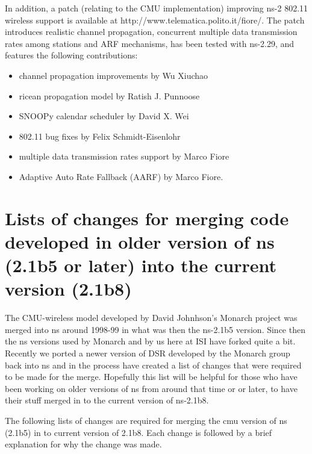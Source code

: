 In addition, a  patch (relating to the CMU implementation) improving ns-2 
802.11 wireless support is available at http://www.telematica.polito.it/fiore/.
The patch introduces realistic channel propagation, concurrent multiple 
data transmission rates among stations and ARF mechanisms, has been 
tested with ns-2.29, and features the following contributions:
\begin{itemize}
\item channel propagation improvements by Wu Xiuchao
\item ricean propagation model by Ratish J. Punnoose
\item SNOOPy calendar scheduler by David X. Wei
\item 802.11 bug fixes by Felix Schmidt-Eisenlohr
\item multiple data transmission rates support by Marco Fiore
\item Adaptive Auto Rate Fallback (AARF) by Marco Fiore. 
\end{itemize}

\section{Lists of changes for merging code developed in older version of ns (2.1b5 or later) into the current version (2.1b8) }
\label{old-merge}

The CMU-wireless model developed by David Johnhson's Monarch project was merged into ns around 1998-99 in what was then the ns-2.1b5 version. Since then the ns versions used by Monarch and by us here at ISI have forked quite a bit. Recently we ported a newer version of DSR developed by the Monarch group back into ns and in the process have created a list of changes that were required to be made for the merge. Hopefully this list will be helpful for those who have been working on older versions of ns from around that time or or later, to have their stuff merged in to the current version of ns-2.1b8. 

The following lists of changes are required for merging the cmu version of ns (2.1b5) in to current version of 2.1b8. Each change is followed by a brief explanation for why the change was made.

